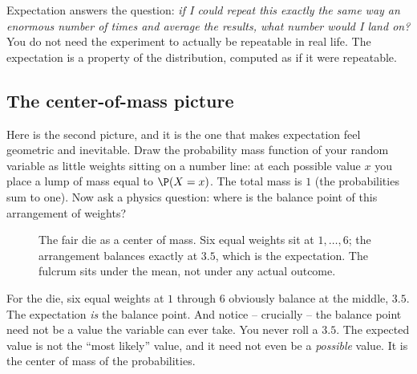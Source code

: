 \begin{intuitionbox}
Expectation answers the question: \emph{if I could repeat this exactly the same
way an enormous number of times and average the results, what number would I land
on?} You do not need the experiment to actually be repeatable in real life. The
expectation is a property of the distribution, computed as if it were repeatable.
\end{intuitionbox}

\subsection{The center-of-mass picture}

Here is the second picture, and it is the one that makes expectation feel
geometric and inevitable. Draw the probability mass function of your random
variable as little weights sitting on a number line: at each possible value $x$
you place a lump of mass equal to $\P(X = x)$. The total mass is $1$ (the
probabilities sum to one). Now ask a physics question: where is the balance point
of this arrangement of weights?

\begin{figure}[H]
\centering
{}
\caption{The fair die as a center of mass. Six equal weights sit at
$1,\dots,6$; the arrangement balances exactly at $3.5$, which is the
expectation. The fulcrum sits under the mean, not under any actual outcome.}
\label{ch08:fig-die-balance}
\end{figure}

For the die, six equal weights at $1$ through $6$ obviously balance at the middle,
$3.5$. The expectation \emph{is} the balance point. And notice -- crucially -- the
balance point need not be a value the variable can ever take. You never roll a
$3.5$. The expected value is not the ``most likely'' value, and it need not even
be a \emph{possible} value. It is the center of mass of the probabilities.

